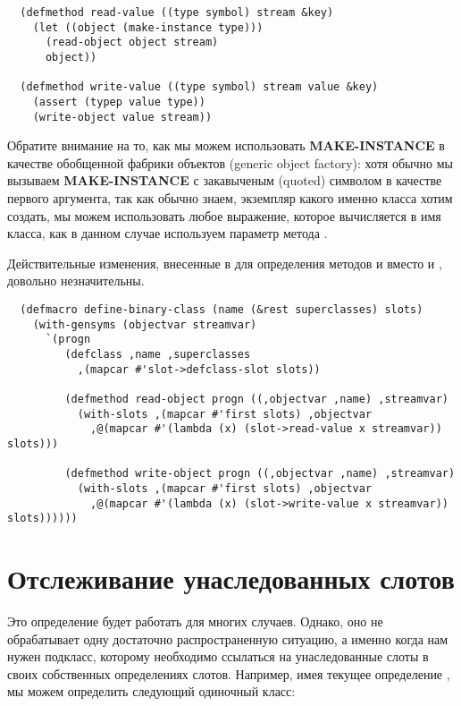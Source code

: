 \begin{lstlisting}
  (defmethod read-value ((type symbol) stream &key)
    (let ((object (make-instance type)))
      (read-object object stream)
      object))

  (defmethod write-value ((type symbol) stream value &key)
    (assert (typep value type))
    (write-object value stream))
\end{lstlisting}

Обратите внимание на то, как мы можем использовать \textbf{MAKE-INSTANCE} в качестве
обобщенной фабрики объектов (generic object factory): хотя обычно мы вызываем
\textbf{MAKE-INSTANCE} с закавыченым (quoted) символом в качестве первого аргумента, так
как обычно знаем, экземпляр какого именно класса хотим создать, мы можем использовать
любое выражение, которое вычисляется в имя класса, как в данном случае используем параметр
 метода .

Действительные изменения, внесенные в  для определения методов
 и  вместо  и ,
довольно незначительны.

\begin{lstlisting}
  (defmacro define-binary-class (name (&rest superclasses) slots)
    (with-gensyms (objectvar streamvar)
      `(progn
         (defclass ,name ,superclasses
           ,(mapcar #'slot->defclass-slot slots))

         (defmethod read-object progn ((,objectvar ,name) ,streamvar)
           (with-slots ,(mapcar #'first slots) ,objectvar
             ,@(mapcar #'(lambda (x) (slot->read-value x streamvar)) slots)))

         (defmethod write-object progn ((,objectvar ,name) ,streamvar)
           (with-slots ,(mapcar #'first slots) ,objectvar
             ,@(mapcar #'(lambda (x) (slot->write-value x streamvar)) slots))))))
\end{lstlisting}

\section{Отслеживание унаследованных слотов}

Это определение будет работать для многих случаев. Однако, оно не обрабатывает одну
достаточно распространенную ситуацию, а именно когда нам нужен подкласс, которому
необходимо ссылаться на унаследованные слоты в своих собственных определениях
слотов. Например, имея текущее определение , мы можем определить
следующий одиночный класс:

